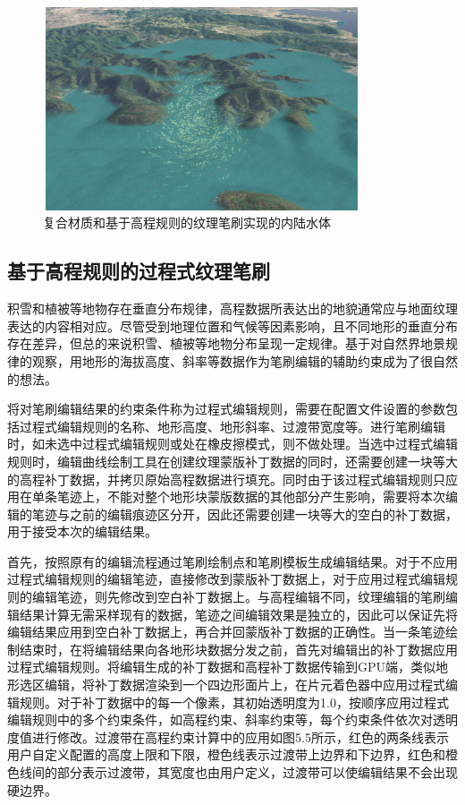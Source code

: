 \begin{figure}[htb]
    \centering
    \includegraphics[height=6cm,width=9.4cm]{figures/water.png}
    \caption{复合材质和基于高程规则的纹理笔刷实现的内陆水体}
\end{figure}
\subsection{基于高程规则的过程式纹理笔刷}
积雪和植被等地物存在垂直分布规律，高程数据所表达出的地貌通常应与地面纹理表达的内容相对应。尽管受到地理位置和气候等因素影响，且不同地形的垂直分布存在差异，但总的来说积雪、植被等地物分布呈现一定规律。基于对自然界地景规律的观察，用地形的海拔高度、斜率等数据作为笔刷编辑的辅助约束成为了很自然的想法。\par
将对笔刷编辑结果的约束条件称为过程式编辑规则，需要在配置文件设置的参数包括过程式编辑规则的名称、地形高度、地形斜率、过渡带宽度等。进行笔刷编辑时，如未选中过程式编辑规则或处在橡皮擦模式，则不做处理。当选中过程式编辑规则时，编辑曲线绘制工具在创建纹理蒙版补丁数据的同时，还需要创建一块等大的高程补丁数据，并拷贝原始高程数据进行填充。同时由于该过程式编辑规则只应用在单条笔迹上，不能对整个地形块蒙版数据的其他部分产生影响，需要将本次编辑的笔迹与之前的编辑痕迹区分开，因此还需要创建一块等大的空白的补丁数据，用于接受本次的编辑结果。\par
首先，按照原有的编辑流程通过笔刷绘制点和笔刷模板生成编辑结果。对于不应用过程式编辑规则的编辑笔迹，直接修改到蒙版补丁数据上，对于应用过程式编辑规则的编辑笔迹，则先修改到空白补丁数据上。与高程编辑不同，纹理编辑的笔刷编辑结果计算无需采样现有的数据，笔迹之间编辑效果是独立的，因此可以保证先将编辑结果应用到空白补丁数据上，再合并回蒙版补丁数据的正确性。当一条笔迹绘制结束时，在将编辑结果向各地形块数据分发之前，首先对编辑出的补丁数据应用过程式编辑规则。将编辑生成的补丁数据和高程补丁数据传输到GPU端，类似地形选区编辑，将补丁数据渲染到一个四边形面片上，在片元着色器中应用过程式编辑规则。对于补丁数据中的每一个像素，其初始透明度为1.0，按顺序应用过程式编辑规则中的多个约束条件，如高程约束、斜率约束等，每个约束条件依次对透明度值进行修改。过渡带在高程约束计算中的应用如图5.5所示，红色的两条线表示用户自定义配置的高度上限和下限，橙色线表示过渡带上边界和下边界，红色和橙色线间的部分表示过渡带，其宽度也由用户定义，过渡带可以使编辑结果不会出现硬边界。
